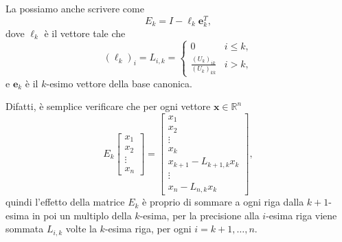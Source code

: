 \documentclass[a4paper]{report}
\theoremstyle{definiton}
\theoremstyle{remark}
\newcommand{\x}{\mathbf{x}}
\begin{document}
La possiamo anche scrivere come
\[
E_k = I - \boldsymbol{\ell}_k \mathbf{e}_k^T,
\]
dove $\boldsymbol{\ell}_k$ è il vettore tale che 
\[
(\boldsymbol{\ell}_k)_i = L_{i,k} = \begin{cases}
0 & i \leq k,\\
\frac{(U_k)_{ik}}{(U_k)_{kk}} & i>k,
\end{cases}
\]
e $\mathbf{e}_k$ è il $k$-esimo vettore della base canonica.

Difatti, è semplice verificare che per ogni vettore $\x\in\mathbb{R}^n$ 
\[
E_k \begin{bmatrix}
    x_1\\x_2\\ \vdots \\ x_n
\end{bmatrix}
=
\begin{bmatrix}
    x_1 \\ x_2\\ \vdots \\ x_k \\ x_{k+1} - L_{k+1,k}x_k\\
    \vdots \\
    x_n - L_{n,k}x_k
\end{bmatrix},
\]
quindi l'effetto della matrice $E_k$ è proprio di sommare a ogni riga dalla $k+1$-esima in poi un multiplo della $k$-esima, per la precisione alla $i$-esima riga viene sommata $L_{i,k}$ volte la $k$-esima riga, per ogni $i=k+1,\dots,n$.
\end{document}
